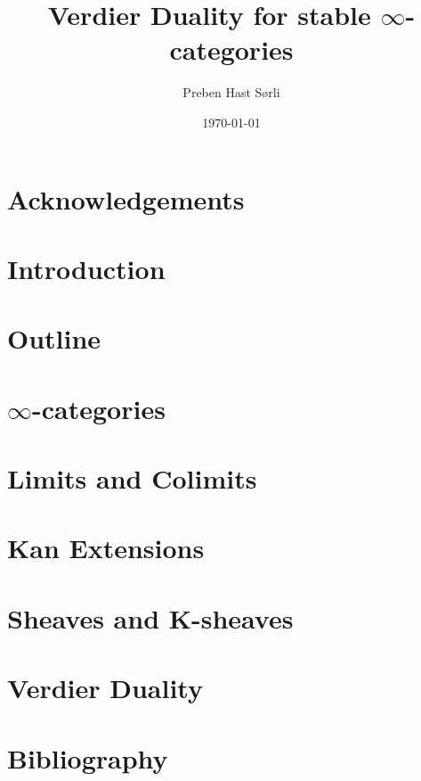 \documentclass[british,titlepage]{ntnuthesis}
\title{Verdier Duality for stable $\infty$-categories}
\author{Preben Hast Sørli}
\date{\today}
\begin{document}

\chapter*{Acknowledgements}

\tableofcontents
\chapter*{Introduction}

\chapter*{Outline}

\chapter{$\infty$-categories}\label{infcatchap}

\chapter{Limits and Colimits}\label{limscolims}



\chapter{Kan Extensions}\label{kanchap}

\chapter{Sheaves and K-sheaves}\label{sheavescap}


\chapter{Verdier Duality}\label{verdiercap}

\chapter*{Bibliography}
\printbibliography[heading=none]
\end{document}
